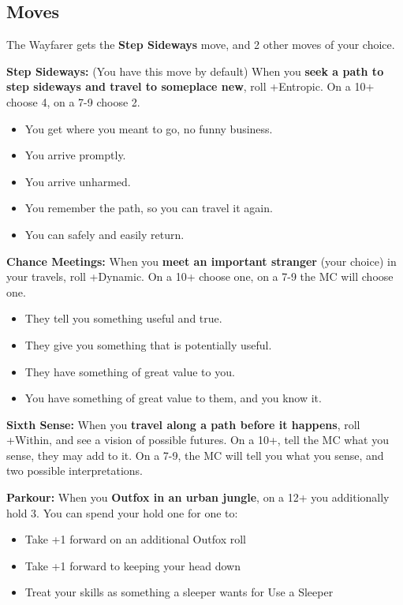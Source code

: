 \documentclass[
  oneside,
  statementpaper,
  9pt]{memoir}
\begin{document}
\hypertarget{moves-8}{%
\subsection{Moves}\label{moves-8}}

The Wayfarer gets the \textbf{Step Sideways} move, and 2 other moves of
your choice.

\textbf{Step Sideways:} (You have this move by default) When you
\textbf{seek a path to step sideways and travel to someplace new}, roll
+Entropic. On a 10+ choose 4, on a 7-9 choose 2.

\begin{itemize}
\tightlist
\item
  You get where you meant to go, no funny business.
\item
  You arrive promptly.
\item
  You arrive unharmed.
\item
  You remember the path, so you can travel it again.
\item
  You can safely and easily return.
\end{itemize}

\textbf{Chance Meetings:} When you \textbf{meet an important stranger}
(your choice) in your travels, roll +Dynamic. On a 10+ choose one, on a
7-9 the MC will choose one.

\begin{itemize}
\tightlist
\item
  They tell you something useful and true.
\item
  They give you something that is potentially useful.
\item
  They have something of great value to you.
\item
  You have something of great value to them, and you know it.
\end{itemize}

\textbf{Sixth Sense:} When you \textbf{travel along a path before it
happens}, roll +Within, and see a vision of possible futures. On a 10+,
tell the MC what you sense, they may add to it. On a 7-9, the MC will
tell you what you sense, and two possible interpretations.

\textbf{Parkour:} When you \textbf{Outfox in an urban jungle}, on a 12+
you additionally hold 3. You can spend your hold one for one to:

\begin{itemize}
\tightlist
\item
  Take +1 forward on an additional Outfox roll
\item
  Take +1 forward to keeping your head down
\item
  Treat your skills as something a sleeper wants for Use a Sleeper
\end{itemize}
\end{document}
